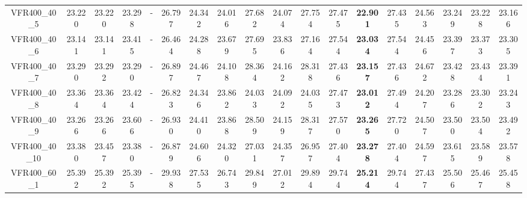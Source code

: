 \begin{tabular}{cc|ccc|ccccccccccccc}
VFR400\_40\_5      & 23.220           & 23.220           & 23.298           & -                & 26.797           & 24.342           & 24.016           & 27.682           & 24.074           & 27.754           & 27.475           & {\bf 22.901}     & 27.435           & 24.563           & 23.249           & 23.228           & 23.166          \\ 
VFR400\_40\_6      & 23.141           & 23.141           & 23.415           & -                & 26.464           & 24.288           & 23.679           & 27.695           & 23.836           & 27.164           & 27.544           & {\bf 23.034}     & 27.544           & 24.456           & 23.397           & 23.373           & 23.305          \\ 
VFR400\_40\_7      & 23.290           & 23.292           & 23.290           & -                & 26.897           & 24.467           & 24.108           & 28.364           & 24.162           & 28.318           & 27.436           & {\bf 23.157}     & 27.436           & 24.672           & 23.428           & 23.434           & 23.391          \\ 
VFR400\_40\_8      & 23.364           & 23.364           & 23.424           & -                & 26.823           & 24.346           & 23.862           & 24.033           & 24.092           & 24.035           & 27.473           & {\bf 23.012}     & 27.494           & 24.207           & 23.286           & 23.302           & 23.243          \\ 
VFR400\_40\_9      & 23.266           & 23.266           & 23.606           & -                & 26.930           & 24.410           & 23.868           & 28.509           & 24.159           & 28.317           & 27.570           & {\bf 23.265}     & 27.720           & 24.507           & 23.500           & 23.504           & 23.492          \\ 
VFR400\_40\_10     & 23.380           & 23.457           & 23.380           & -                & 26.879           & 24.606           & 24.320           & 27.031           & 24.357           & 26.957           & 27.404           & {\bf 23.278}     & 27.404           & 24.597           & 23.615           & 23.589           & 23.578          \\ 
VFR400\_60\_1      & 25.392           & 25.392           & 25.395           & -                & 29.938           & 27.535           & 26.743           & 29.849           & 27.012           & 29.894           & 29.744           & {\bf 25.214}     & 29.744           & 27.437           & 25.506           & 25.467           & 25.458          \\ 

\end{tabular}
